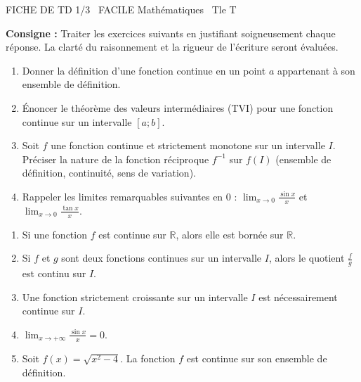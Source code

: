 \documentclass[11pt]{article}
\begin{document}
\begin{tcolorbox}[enhanced,colback=popink,colframe=popink,arc=10pt,boxrule=0pt,left=12pt,right=12pt,top=9pt,bottom=9pt]
{\color{white}\popxbold\small FICHE DE TD 1/3 \textbullet\ FACILE \hfill Mathématiques \textbullet\ Tle T\par}
\end{tcolorbox}
\vspace{4pt}
\noindent \textbf{Consigne :} Traiter les exercices suivants en justifiant soigneusement chaque réponse. La clarté du raisonnement et la rigueur de l'écriture seront évaluées.

\begin{exercice}
\begin{enumerate}
    \item Donner la définition d'une fonction continue en un point $a$ appartenant à son ensemble de définition.
    \item Énoncer le théorème des valeurs intermédiaires (TVI) pour une fonction continue sur un intervalle $[a;b]$.
    \item Soit $f$ une fonction continue et strictement monotone sur un intervalle $I$. Préciser la nature de la fonction réciproque $f^{-1}$ sur $f(I)$ (ensemble de définition, continuité, sens de variation).
    \item Rappeler les limites remarquables suivantes en $0$ : $\lim_{x\to 0}\frac{\sin x}{x}$ et $\lim_{x\to 0}\frac{\tan x}{x}$.
\end{enumerate}
\end{exercice}

\begin{exercice}
\begin{enumerate}
    \item Si une fonction $f$ est continue sur $\mathbb{R}$, alors elle est bornée sur $\mathbb{R}$.
    \item Si $f$ et $g$ sont deux fonctions continues sur un intervalle $I$, alors le quotient $\frac{f}{g}$ est continu sur $I$.
    \item Une fonction strictement croissante sur un intervalle $I$ est nécessairement continue sur $I$.
    \item $\lim_{x\to +\infty} \frac{\sin x}{x} = 0$.
    \item Soit $f(x)=\sqrt{x^2-4}$. La fonction $f$ est continue sur son ensemble de définition.
\end{enumerate}
\end{exercice}
\end{document}
